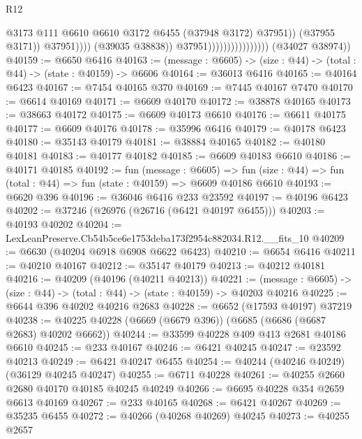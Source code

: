\begin{lexlean}{R12}
\begin{coremodule}
                                                      @3173
                                                      @111
                                                      @6610
                                                      @6610
                                                      @3172
                                                      @6455
                                                      (@37948 @3172)
                                                      @37951))
                                                  (@37955 @3171))
                                                @37951))))
                                        (@39035 @38838))
                                      @37951))))))))))))))))
      (@34027 @38974))
@40159 := @6650 @6416
@40163 := (message : @6605) -> (size : @44) -> (total : @44) -> (state : @40159) -> @6606
@40164 := @36013 @6416
@40165 := @40164 @6423
@40167 := @7454 @40165 @370
@40169 := @7445 @40167 @7470
@40170 := @6614 @40169
@40171 := @6609 @40170
@40172 := @38878 @40165
@40173 := @38663 @40172
@40175 := @6609 @40173 @6610
@40176 := @6611 @40175
@40177 := @6609 @40176
@40178 := @35996 @6416
@40179 := @40178 @6423
@40180 := @35143 @40179
@40181 := @38884 @40165
@40182 := @40180 @40181
@40183 := @40177 @40182
@40185 := @6609 @40183 @6610
@40186 := @40171 @40185
@40192 := fun (message : @6605) =>
  fun (size : @44) => fun (total : @44) => fun (state : @40159) => @6609 @40186 @6610
@40193 := @6620 @396
@40196 := @36046 @6416 @233 @23592
@40197 := @40196 @6423
@40202 := @37246 (@26976 (@26716 (@6421 @40197 @6455)))
@40203 := @40193 @40202
@40204 := LexLeanPreserve.Cb54b5ce6e1753deba173f2954c882034.R12.__fits_10
@40209 := @6630 (@40204 @6918 @6908 @6622 @6423)
@40210 := @6654 @6416
@40211 := @40210 @40167
@40212 := @35147 @40179
@40213 := @40212 @40181
@40216 := @40209 (@40196 (@40211 @40213))
@40221 := (message : @6605) -> (size : @44) -> (total : @44) -> (state : @40159) -> @40203 @40216
@40225 := @6644 @396 @40202 @40216 @2683
@40228 := @6652 (@17593 @40197) @37219
@40238 := @40225 @40228 (@6669 (@6679 @396)) (@6685 (@6686 (@6687 @2683) @40202 @6662))
@40244 := @33599 @40228 @409 @413 @2681 @40186 @6610
@40245 := @233 @40167
@40246 := @6421 @40245
@40247 := @23592 @40213
@40249 := @6421 @40247 @6455
@40254 := @40244 (@40246 @40249) (@36129 @40245 @40247)
@40255 := @6711 @40228
@40261 := @40255 @2660 @2680 @40170 @40185 @40245 @40249
@40266 := @6695 @40228 @354 @2659 @6613 @40169
@40267 := @233 @40165
@40268 := @6421 @40267
@40269 := @35235 @6455
@40272 := @40266 (@40268 @40269) @40245
@40273 := @40255 @2657

\end{coremodule}
\end{lexlean}
